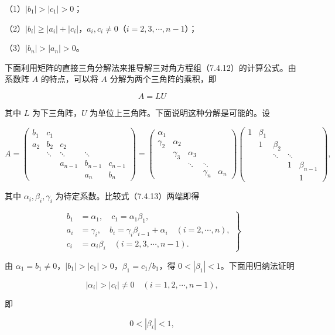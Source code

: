 \documentclass[
  10pt,
  fontset=fandol]{ctexart}
\begin{document}
（1）\(|b_1|>|c_1|>0\)；

（2）\(|b_i|\geqslant|a_i|+|c_i|\)，\(a_i,c_i\neq0\)（\(i=2,3,\cdots,n-1\)）；

（3）\(|b_n|>|a_n|>0\)。

下面利用矩阵的直接三角分解法来推导解三对角方程组（7.4.12）的计算公式。由系数阵 \(A\) 的特点，可以将 \(A\) 分解为两个三角阵的乘积，即

\[
A=LU
\]

其中 \(L\) 为下三角阵，\(U\) 为单位上三角阵。下面说明这种分解是可能的。设

\[
A=\begin{pmatrix}
b_1&c_1&&&\\
a_2&b_2&c_2&&\\
&\ddots&\ddots&\ddots&\\
&&a_{n-1}&b_{n-1}&c_{n-1}\\
&&&a_n&b_n
\end{pmatrix}
=\begin{pmatrix}
\alpha_1&&&&\\
\gamma_2&\alpha_2&&&\\
&\gamma_3&\alpha_3&&\\
&&\ddots&\ddots&\\
&&&\gamma_n&\alpha_n
\end{pmatrix}
\begin{pmatrix}
1&\beta_1&&&\\
&1&\beta_2&&\\
&&\ddots&\ddots&\\
&&&1&\beta_{n-1}\\
&&&&1
\end{pmatrix},
\tag{7.4.13}
\]

其中 \(\alpha_i,\beta_i,\gamma_i\) 为待定系数。比较式（7.4.13）两端即得

\[
\left.\begin{aligned}
b_1&=\alpha_1,\quad c_1=\alpha_1\beta_1,\\
a_i&=\gamma_i,\quad b_i=\gamma_i\beta_{i-1}+\alpha_i\quad(i=2,\cdots,n),\\
c_i&=\alpha_i\beta_i\quad(i=2,3,\cdots,n-1).
\end{aligned}\right\}
\tag{7.4.14}
\]

由 \(\alpha_1=b_1\neq0\)，\(|b_1|>|c_1|>0\)，\(\beta_1=c_1/b_1\)，得 \(0<|\beta_1|<1\)。下面用归纳法证明

\[
|\alpha_i|>|c_i|\neq0\quad(i=1,2,\cdots,n-1),
\tag{7.4.15}
\]

即

\[
0<|\beta_i|<1,
\]
\end{document}
